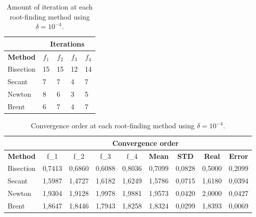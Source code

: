 \documentclass[11pt]{exam}
\begin{document}
\begin{table}[h!]
	\centering
	\begin{tabular}{l|l|l|l|l|}
		\cline{2-5}
		& \multicolumn{4}{c|}{\textbf{Iterations}}                                                                                        \\ \hline
		\multicolumn{1}{|c|}{\textbf{Method}} & \multicolumn{1}{c|}{$f_1$} & \multicolumn{1}{c|}{$f_2$} & \multicolumn{1}{c|}{$f_3$} & \multicolumn{1}{c|}{$f_4$} \\ \hline
		\multicolumn{1}{|l|}{Bisection}       & 15                        & 15                        & 12                                 & 14                                 \\ \hline
		\multicolumn{1}{|l|}{Secant}          & 7                         & 7                         & 4                                  & 7                                  \\ \hline
		\multicolumn{1}{|l|}{Newton}          & 8                         & 6                         & 3                                  & 5                                  \\ \hline
		\multicolumn{1}{|l|}{Brent}           & 6                         & 7                         & 4                                  & 7                                  \\ \hline
	\end{tabular}\caption{Amount of iteration at each root-finding method using $\delta=10^{-4}$.}\label{tb:iterations}
\end{table}


\begin{table}[!h]
	\centering
	\begin{tabular}{l|c|c|c|c|c|c|c|c|}
		\cline{2-9}
		& \multicolumn{8}{c|}{\textbf{Convergence order}}                                                                                   \\ \hline
		\multicolumn{1}{|c|}{\textbf{Method}} & f\_1   & f\_2   & f\_3   & f\_4   & \textbf{Mean}                 & \textbf{STD} & \textbf{Real}                 & \textbf{Error} \\ \hline
		\multicolumn{1}{|l|}{Bisection}       & 0,7413 & 0,6860 & 0,6088 & 0,8036 & {\color[HTML]{3166FF} 0,7099} & 0,0828       & {\color[HTML]{CE6301} 0,5000} & 0,2099         \\ \hline
		\multicolumn{1}{|l|}{Secant}          & 1,5987 & 1,4727 & 1,6182 & 1,6249 & {\color[HTML]{3166FF} 1,5786} & 0,0715       & {\color[HTML]{CE6301} 1,6180} & 0,0394         \\ \hline
		\multicolumn{1}{|l|}{Newton}          & 1,9304 & 1,9128 & 1,9978 & 1,9881 & {\color[HTML]{3166FF} 1,9573} & 0,0420       & {\color[HTML]{CE6301} 2,0000} & 0,0427         \\ \hline
		\multicolumn{1}{|l|}{Brent}           & 1,8647 & 1,8446 & 1,7943 & 1,8258 & {\color[HTML]{3166FF} 1,8324} & 0,0299       & {\color[HTML]{CE6301} 1,8393} & 0,0069         \\ \hline
	\end{tabular}\caption{Convergence order at each root-finding method using $\delta=10^{-4}$.}\label{tb:convergence}
\end{table}
\end{document}

